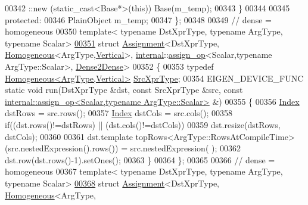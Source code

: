 \begin{DoxyCode}
00342     ::new (static\_cast<Base*>(\textcolor{keyword}{this})) Base(m\_temp);
00343   \}
00344 
00345 \textcolor{keyword}{protected}:
00346   PlainObject m\_temp;
00347 \};
00348 
00349 \textcolor{comment}{// dense = homogeneous}
00350 \textcolor{keyword}{template}< \textcolor{keyword}{typename} DstXprType, \textcolor{keyword}{typename} ArgType, \textcolor{keyword}{typename} Scalar>
\hyperlink{struct_eigen_1_1internal_1_1_assignment_3_01_dst_xpr_type_00_01_homogeneous_3_01_arg_type_00_01_0510af0d603205dcee3ee308c9bc1bc6}{00351} \textcolor{keyword}{struct }\hyperlink{struct_eigen_1_1internal_1_1_assignment}{Assignment}<DstXprType, \hyperlink{group___geometry___module_class_eigen_1_1_homogeneous}{Homogeneous}<ArgType,\hyperlink{group__enums_ggad49a7b3738e273eb00932271b36127f7addca718e0564723df21d61b94b1198be}{Vertical}>, 
      \hyperlink{namespaceinternal}{internal}::\hyperlink{struct_eigen_1_1internal_1_1assign__op}{assign\_op}<Scalar,typename ArgType::Scalar>, 
      \hyperlink{struct_eigen_1_1internal_1_1_dense2_dense}{Dense2Dense}>
00352 \{
00353   \textcolor{keyword}{typedef} \hyperlink{group___geometry___module_class_eigen_1_1_homogeneous}{Homogeneous<ArgType,Vertical>} \hyperlink{group___geometry___module_class_eigen_1_1_homogeneous}{SrcXprType};
00354   EIGEN\_DEVICE\_FUNC \textcolor{keyword}{static} \textcolor{keywordtype}{void} run(DstXprType &dst, \textcolor{keyword}{const} SrcXprType &src, \textcolor{keyword}{const} 
      \hyperlink{struct_eigen_1_1internal_1_1assign__op}{internal::assign\_op<Scalar,typename ArgType::Scalar>} &)
00355   \{
00356     \hyperlink{namespace_eigen_a62e77e0933482dafde8fe197d9a2cfde}{Index} dstRows = src.rows();
00357     \hyperlink{namespace_eigen_a62e77e0933482dafde8fe197d9a2cfde}{Index} dstCols = src.cols();
00358     \textcolor{keywordflow}{if}((dst.rows()!=dstRows) || (dst.cols()!=dstCols))
00359       dst.resize(dstRows, dstCols);
00360 
00361     dst.template topRows<ArgType::RowsAtCompileTime>(src.nestedExpression().rows()) = src.nestedExpression(
      );
00362     dst.row(dst.rows()-1).setOnes();
00363   \}
00364 \};
00365 
00366 \textcolor{comment}{// dense = homogeneous}
00367 \textcolor{keyword}{template}< \textcolor{keyword}{typename} DstXprType, \textcolor{keyword}{typename} ArgType, \textcolor{keyword}{typename} Scalar>
\hyperlink{struct_eigen_1_1internal_1_1_assignment_3_01_dst_xpr_type_00_01_homogeneous_3_01_arg_type_00_01_bd4940a657c6f656a2015456f5ba4803}{00368} \textcolor{keyword}{struct }\hyperlink{struct_eigen_1_1internal_1_1_assignment}{Assignment}<DstXprType, \hyperlink{group___geometry___module_class_eigen_1_1_homogeneous}{Homogeneous}<ArgType,

\end{DoxyCode}
